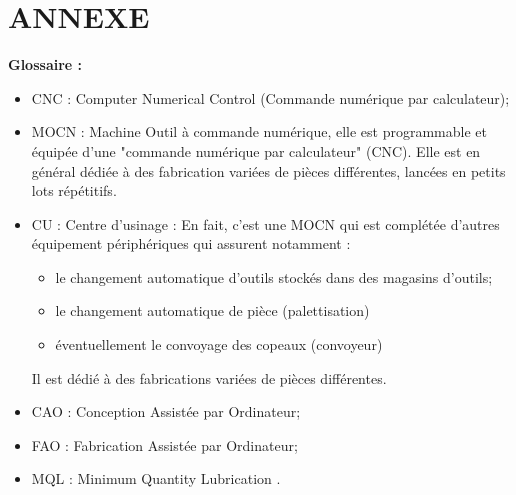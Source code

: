 \documentclass[12pt]{article}
\begin{document}
\section{ANNEXE}
\begin{tcolorbox}[colback=blue!5!white,colframe=orange!75!black]
\begin{center}
    \textbf{Glossaire :}
\end{center}
\begin{itemize}
    \item CNC : Computer Numerical Control (Commande numérique par calculateur);
    \item MOCN : Machine Outil à commande numérique, elle est programmable et équipée d'une "commande numérique par calculateur" (CNC). Elle est en général dédiée à des fabrication variées de pièces différentes, lancées en petits lots répétitifs.
    \item CU : Centre d'usinage : En fait, c'est une MOCN qui est complétée d'autres équipement périphériques qui assurent notamment : \begin{itemize}
        \item le changement automatique d'outils stockés dans des magasins d'outils;
        \item le changement automatique de pièce (palettisation)
        \item éventuellement le convoyage des copeaux (convoyeur)
    \end{itemize}
    Il est dédié à des fabrications variées de pièces différentes.
    \item CAO : Conception Assistée par Ordinateur;
    \item FAO : Fabrication Assistée par Ordinateur;
    \item MQL : Minimum Quantity Lubrication .
\end{itemize}
\end{tcolorbox}
\end{document}
